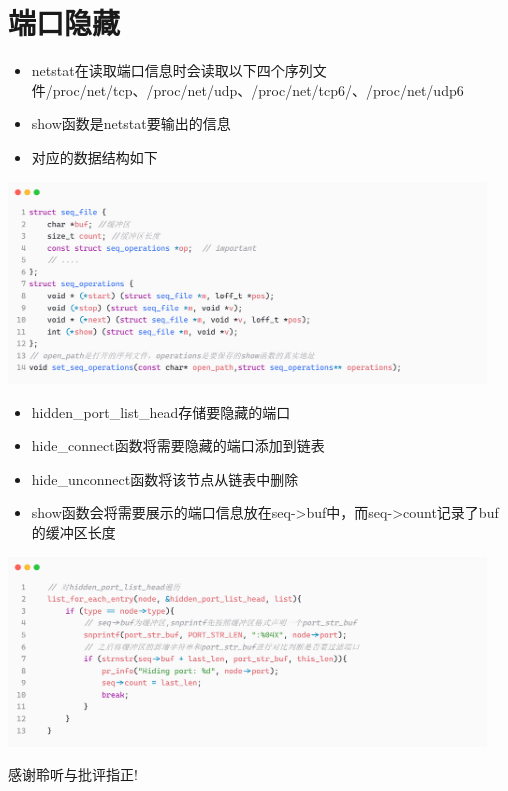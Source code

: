 \documentclass[11pt]{beamer}
\begin{document}
\section{端口隐藏}
\begin{frame}
	\begin{itemize}
		\item netstat在读取端口信息时会读取以下四个序列文件/proc/net/tcp、/proc/net/udp、/proc/net/tcp6/、/proc/net/udp6
		\item show函数是netstat要输出的信息
		\item 对应的数据结构如下
	\end{itemize}
	\begin{itemize}
		\centering
		\includegraphics[width=0.95\textwidth]{pic/seq.png}
	\end{itemize}
\end{frame}

\begin{frame}
	\begin{itemize}
		\item hidden\_port\_list\_head存储要隐藏的端口
		\item hide\_connect函数将需要隐藏的端口添加到链表
		\item hide\_unconnect函数将该节点从链表中删除
		\item show函数会将需要展示的端口信息放在seq->buf中，而seq->count记录了buf的缓冲区长度
	\end{itemize}
	\begin{itemize}
		\centering
		\includegraphics[width=0.95\textwidth]{pic/hideport.png}
	\end{itemize}
\end{frame}









\begin{frame}
    \begin{center}
        {\Huge 感谢聆听与批评指正!}
    \end{center}
\end{frame}
\end{document}
